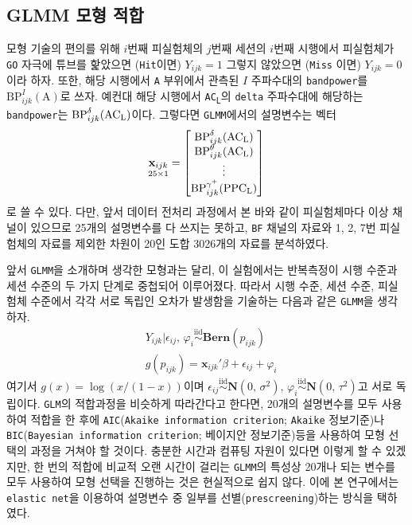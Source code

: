 \documentclass[10pt,onecolumn,twoside,a4size]{gsag3jnl}
\newcommand{\ACL}{AC\textsubscript{L}}
\newcommand{\PPCL}{PPC\textsubscript{L}}
\newcommand{\iid}{\stackrel{\mathrm{iid}}{\sim}}
\begin{document}
\subsection{GLMM 모형 적합}

모형 기술의 편의를 위해 $i$번째 피실험체의 $j$번째 세션의 $i$번째 시행에서 피실험체가 \texttt{GO} 자극에 튜브를 핥았으면 (\texttt{Hit}이면) $Y_{ijk}=1$ 그렇지 않았으면 (\texttt{Miss} 이면) $Y_{ijk}=0$이라 하자. 또한, 해당 시행에서 \texttt{A} 부위에서 관측된 $I$ 주파수대의 \texttt{bandpower}를 $\mathrm{BP}_{ijk}^I(\mathrm{A})$로 쓰자. 예컨대 해당 시행에서 \texttt{\ACL}의 \texttt{delta} 주파수대에 해당하는 \texttt{bandpower}는 $\mathrm{BP}_{ijk}^\delta(\mathrm{\ACL})$이다. 그렇다면 \texttt{GLMM}에서의 설명변수는 벡터
\begin{equation}
  \underset{25\times1}{\mathbf{x}_{ijk}}=\begin{bmatrix*}
    \mathrm{BP}_{ijk}^\delta(\mathrm{\ACL})\\
    \mathrm{BP}_{ijk}^\theta(\mathrm{\ACL})\\
    \vdots\\
    \mathrm{BP}_{ijk}^{\gamma^+}(\mathrm{\PPCL})\\
  \end{bmatrix*}
\end{equation}
로 쓸 수 있다. 다만, 앞서 데이터 전처리 과정에서 본 바와 같이 피실험체마다 이상 채널이 있으므로 25개의 설명변수를 다 쓰지는 못하고, \texttt{BF} 채널의 자료와 1, 2, 7번 피실험체의 자료를 제외한 차원이 20인 도합 3026개의 자료를 분석하였다.

앞서 \texttt{GLMM}을 소개하며 생각한 모형과는 달리, 이 실험에서는 반복측정이 시행 수준과 세션 수준의 두 가지 단계로 중첩되어 이루어졌다. 따라서 시행 수준, 세션 수준, 피실험체 수준에서 각각 서로 독립인 오차가 발생함을 기술하는 다음과 같은 \texttt{GLMM}을 생각하자.
\begin{align}\label{eq:glmm_example}
  &Y_{ijk}\vert\epsilon_{ij},\,\varphi_i\iid\mathbf{Bern}(p_{ijk})\\
  &g(p_{ijk})=\mathbf{x}_{ijk}'\beta+\epsilon_{ij}+\varphi_i\nonumber
\end{align}
여기서 $g(x)=\log(x/(1-x))$이며 $\epsilon_{ij}\iid\mathbf{N}(0,\,\sigma^2),\,\varphi_i\iid\mathbf{N}(0,\,\tau^2)$고 서로 독립이다. \texttt{GLM}의 적합과정을 비슷하게 따라간다고 한다면, 20개의 설명변수를 모두 사용하여 적합을 한 후에 \texttt{AIC}(\texttt{Akaike information criterion}; \texttt{Akaike} 정보기준)나 \texttt{BIC}(\texttt{Bayesian information criterion}; 베이지안 정보기준)등을 사용하여 모형 선택의 과정을 거쳐야 할 것이다. 충분한 시간과 컴퓨팅 자원이 있다면 이렇게 할 수 있겠지만, 한 번의 적합에 비교적 오랜 시간이 걸리는 \texttt{GLMM}의 특성상 20개나 되는 변수를 모두 사용하여 모형 선택을 진행하는 것은 현실적으로 쉽지 않다. 이에 본 연구에서는 \texttt{elastic net}을 이용하여 설명변수 중 일부를 선별(\texttt{prescreening})하는 방식을 택하였다.
\end{document}
